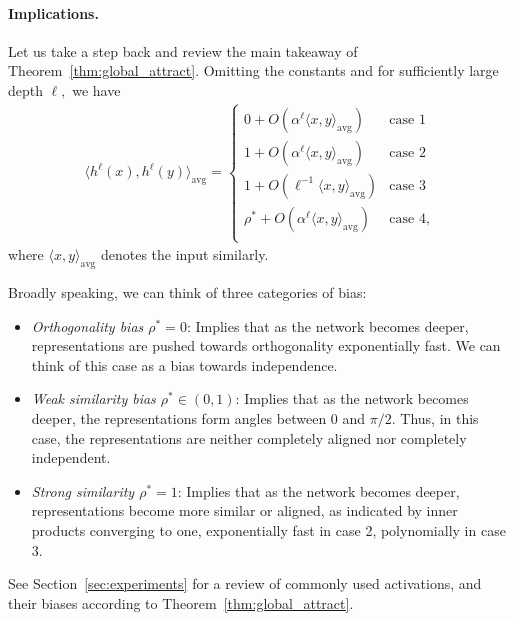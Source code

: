 \documentclass[twoside]{article}
\newcommand{\avg}{\text{avg}}
\theoremstyle{definition}
\begin{document}
\paragraph{Implications.}  Let us take a step back and review the main takeaway of Theorem~\ref{thm:global_attract}. Omitting the constants and for sufficiently large depth $\ell,$ we have 
\begin{align*}
    \langle h^{\ell}(x), h^{\ell}(y)\rangle_\avg =  \begin{cases}
          0+ O(\alpha ^ \ell \langle x, y \rangle_\avg)  & \text{case 1}\\
         1 + O(\alpha ^ \ell \langle x, y \rangle_\avg)  & \text{case 2}\\
         1 + O \left(\ell^{-1}\langle x, y \rangle_\avg \right)   & \text{case 3}\\
         \rho^* + O(\alpha ^ \ell \langle x, y \rangle_\avg)  & \text{case 4},\\
    \end{cases}
\end{align*}
where $\langle x,y\rangle_\avg $ denotes the input similarly. 

Broadly speaking, we can think of three categories of bias:

\begin{itemize}
    \item \textit{Orthogonality bias $\rho^*=0$}: Implies that as the network becomes deeper, representations are pushed towards orthogonality exponentially fast. We can think of this case as a bias towards independence. 
    \item \textit{Weak similarity bias $\rho^*\in (0,1)$}: Implies that as the network becomes deeper, the representations form angles between $0$ and $\pi/2$. Thus, in this case, the representations are neither completely aligned nor completely independent. 
    \item \textit{Strong similarity $\rho^*=1$}: Implies that as the network becomes deeper, representations become more similar or aligned, as indicated by inner products converging to one, exponentially fast in case 2, polynomially in case 3. 
\end{itemize}

See Section~\ref{sec:experiments} for a review of commonly used activations, and their biases according to Theorem~\ref{thm:global_attract}.
\end{document}

